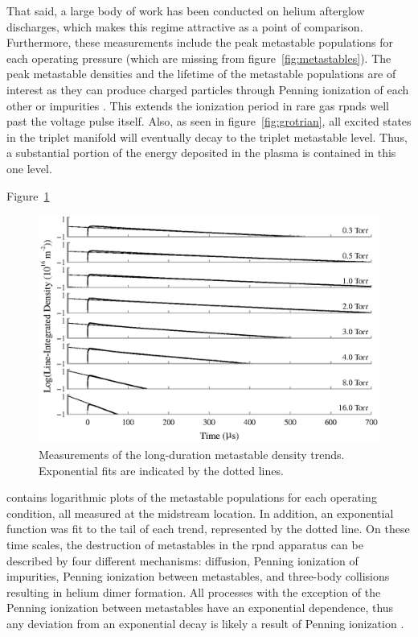 That said, a large body of work has been conducted on helium afterglow
discharges, which makes this regime attractive as a point of comparison.
Furthermore, these measurements include the peak metastable populations for each
operating pressure (which are missing from figure~\ref{fig:metastables}). The
peak metastable densities and the lifetime of the metastable populations are of
interest as they can produce charged particles through Penning ionization of
each other or impurities \cite{Nersisyan2004}. This extends the ionization
period in rare gas \acs{rpnd}s well past the voltage pulse itself. Also, as seen
in figure~\ref{fig:grotrian}, all excited states in the triplet manifold will
eventually decay to the triplet metastable level. Thus, a substantial portion of
the energy deposited in the plasma is contained in this one level.

Figure~\ref{fig:long}
\begin{figure}
  \centering
  \includegraphics{./chapters/metastables/figures/long.eps}
  \caption{Measurements of the long-duration metastable density trends.
  Exponential fits are indicated by the dotted lines.}
  \label{fig:long}
\end{figure}
contains logarithmic plots of the metastable populations for each operating
condition, all measured at the midstream location. In addition, an exponential
function was fit to the tail of each trend, represented by the dotted line. On
these time scales, the destruction of metastables in the \acs{rpnd} apparatus
can be described by four different mechanisms: diffusion, Penning ionization of
impurities, Penning ionization between metastables, and three-body collisions
resulting in helium dimer formation. All processes with the exception of the
Penning ionization between metastables have an exponential dependence, thus any
deviation from an exponential decay is likely a result of Penning ionization
\cite{Deloche1976}.

